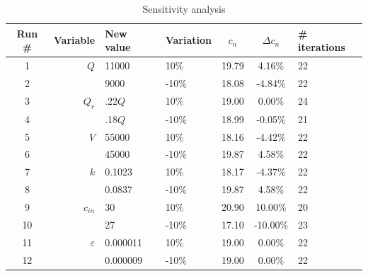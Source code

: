 \documentclass[titlepage,12pt]{article}
\begin{document}
\begin{table}[h]
\begin{center}
\caption{Sensitivity analysis}
\begin{tabular}{|c|r|l|l|c|c|l|}
\hline
{\bf Run \#} & {\bf Variable} & {\bf New value} & {\bf Variation} & {\bf $c_n$} & {\bf $\Delta c_n$} & {\bf \# iterations} \\
\hline
         1 &        $Q$ &      11000 &        10\% &      19.79 &      4.16\% &         22 \\

         2 &            &       9000 &       -10\% &      18.08 &     -4.84\% &         22 \\
\hline
         3 &      $Q_r$ &     .22$Q$ &        10\% &      19.00 &      0.00\% &         24 \\

         4 &            &     .18$Q$ &       -10\% &      18.99 &     -0.05\% &         21 \\
\hline
         5 &        $V$ &      55000 &        10\% &      18.16 &     -4.42\% &         22 \\

         6 &            &      45000 &       -10\% &      19.87 &      4.58\% &         22 \\
\hline
         7 &        $k$ &     0.1023 &        10\% &      18.17 &     -4.37\% &         22 \\

         8 &            &     0.0837 &       -10\% &      19.87 &      4.58\% &         22 \\
\hline
         9 &   $c_{in}$ &         30 &        10\% &      20.90 &     10.00\% &         20 \\

        10 &            &         27 &       -10\% &      17.10 &    -10.00\% &         23 \\
\hline
        11 & $\varepsilon$ &   0.000011 &        10\% &      19.00 &      0.00\% &         22 \\

        12 &            &   0.000009 &       -10\% &      19.00 &      0.00\% &         22 \\
\hline
\end{tabular}
\end{center}
\end{table}
\end{document}
